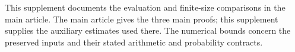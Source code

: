 \documentclass[review,supplement,nohypdvips,hidelinks,onefignum,onetabnum]{siamart251216}
\begin{document}
\maketitle
This supplement documents the evaluation and finite-size comparisons in the
main article. The main article gives the three main proofs; this supplement supplies
the auxiliary estimates used there.
The numerical bounds concern the preserved inputs and their stated arithmetic
and probability contracts.








\FloatBarrier


\end{document}
